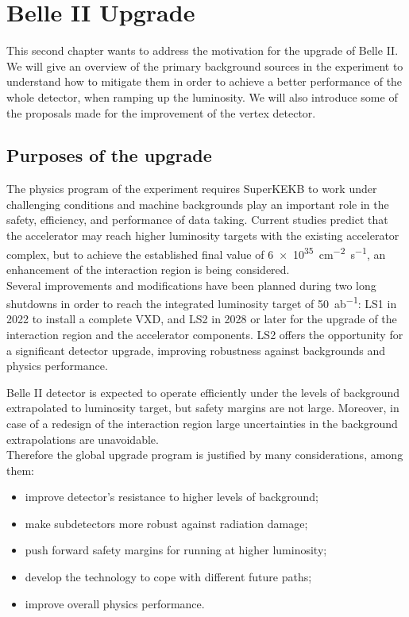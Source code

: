 \chapter{Belle II Upgrade} \label{ch:upgrade}

This second chapter wants to address the motivation for the upgrade of Belle II. We will give an overview of the primary background sources in the experiment to understand how to mitigate them in order to achieve a better performance of the whole detector, when ramping up the luminosity. We will also introduce some of the proposals made for the improvement of the vertex detector.



\section{Purposes of the upgrade}

The physics program of the experiment requires SuperKEKB to work under challenging conditions and machine backgrounds play an important role in the safety, efficiency, and performance of data taking. 
Current studies \cite{Natochii:2022vcs} predict that the accelerator may reach higher luminosity targets with the existing accelerator complex, but to achieve the established final value of \SI{6e35}{cm^{-2} s^{-1}}, an enhancement of the interaction region is being considered.\\
Several improvements and modifications have been planned during two long shutdowns in order to reach the integrated luminosity target of \SI{50}{ab^{-1}}: LS1 in 2022 to install a complete VXD, and LS2 in 2028 or later for the upgrade of the interaction region and the accelerator components. LS2 offers the opportunity for a significant detector upgrade, improving robustness against backgrounds and physics performance.

Belle II detector is expected to operate efficiently under the levels of background extrapolated to luminosity target, but safety margins are not large. Moreover, in case of a redesign of the interaction region large uncertainties in the background extrapolations are unavoidable. \\

Therefore the global upgrade program \cite{Forti:2022mti} is justified by many considerations, among them:

\begin{itemize}
\item improve detector's resistance to higher levels of background;
\item make subdetectors more robust against radiation damage;
\item push forward safety margins for running at higher luminosity;
\item develop the technology to cope with different future paths;
\item improve overall physics performance.
\end{itemize}


